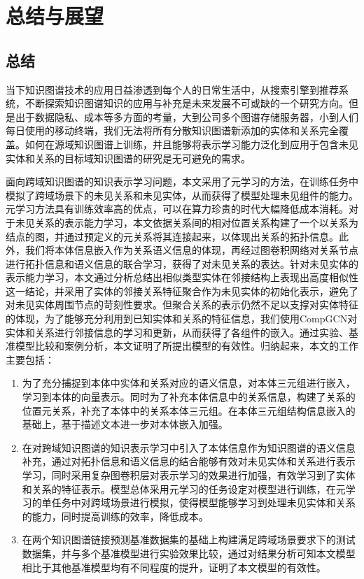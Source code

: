 \chapter{总结与展望}

\section{总结}
当下知识图谱技术的应用日益渗透到每个人的日常生活中，从搜索引擎到推荐系统，不断探索知识图谱知识的应用与补充是未来发展不可或缺的一个研究方向。但是出于数据隐私、成本等多方面的考量，大到公司多个图谱存储服务器，小到人们每日使用的移动终端，我们无法将所有分散知识图谱新添加的实体和关系完全覆盖。如何在源域知识图谱上训练，并且能够将表示学习能力泛化到应用于包含未见实体和关系的目标域知识图谱的研究是无可避免的需求。

面向跨域知识图谱的知识表示学习问题，本文采用了元学习的方法，在训练任务中模拟了跨域场景下的未见关系和未见实体，从而获得了模型处理未见组件的能力。元学习方法具有训练效率高的优点，可以在算力珍贵的时代大幅降低成本消耗。对于未见关系的表示能力学习，本文依据关系间的相对位置关系构建了一个以关系为结点的图，并通过预定义的元关系将其连接起来，以体现出关系的拓扑信息。此外，我们将本体信息嵌入作为关系语义信息的体现，再经过图卷积网络对关系节点进行拓扑信息和语义信息的联合学习，获得了对未见关系的表达。针对未见实体的表示能力学习，本文通过分析总结出相似类型实体在邻接结构上表现出高度相似性这一结论，并采用了实体的邻接关系特征聚合作为未见实体的初始化表示，避免了对未见实体周围节点的苛刻性要求。但聚合关系的表示仍然不足以支撑对实体特征的体现，为了能够充分利用到已知实体和关系的特征信息，我们使用CompGCN对实体和关系进行邻接信息的学习和更新，从而获得了各组件的嵌入。通过实验、基准模型比较和案例分析，本文证明了所提出模型的有效性。归纳起来，本文的工作主要包括：
\begin{enumerate}[label=\arabic*)]
  \item 为了充分捕捉到本体中实体和关系对应的语义信息，对本体三元组进行嵌入，学习到本体的向量表示。同时为了补充本体信息中的关系信息，构建了关系的位置元关系，补充了本体中的关系本体三元组。在本体三元组结构信息嵌入的基础上，基于描述文本进一步对本体嵌入加强。
  \item 在对跨域知识图谱的知识表示学习中引入了本体信息作为知识图谱的语义信息补充，通过对拓扑信息和语义信息的结合能够有效对未见实体和关系进行表示学习，同时采用复杂图卷积层对表示学习的效果进行加强，有效学习到了实体和关系的特征表示。模型总体采用元学习的任务设定对模型进行训练，在元学习的单任务中对跨域场景进行模拟，使得模型能够学习到处理未见实体和关系的能力，同时提高训练的效率，降低成本。
  \item 在两个知识图谱链接预测基准数据集的基础上构建满足跨域场景要求下的测试数据集，并与多个基准模型进行实验效果比较，通过对结果分析可知本文模型相比于其他基准模型均有不同程度的提升，证明了本文模型的有效性。
\end{enumerate}

